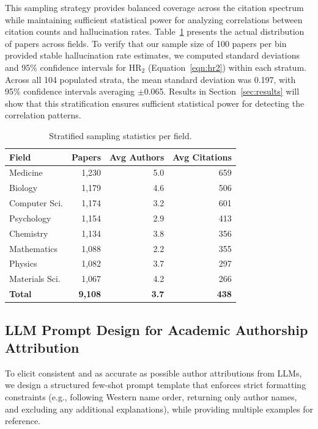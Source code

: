\documentclass[11pt]{article}
\begin{document}
This sampling strategy provides balanced coverage across the citation spectrum while maintaining sufficient statistical power for analyzing correlations between citation counts and hallucination rates. Table~\ref{tab:field_sample_sizes} presents the actual distribution of papers across fields. To verify that our sample size of 100 papers per bin provided stable hallucination rate estimates, we computed standard deviations and 95\% confidence intervals for HR$_2$ (Equation~\ref{eqn:hr2}) within each  stratum. Across all 104 populated strata, the mean standard deviation was 0.197, with 95\% confidence intervals averaging $\pm$0.065. Results in Section~\ref{sec:results} will show that this stratification ensures sufficient statistical power for detecting the correlation patterns.

\setlength{\tabcolsep}{1pt}
\begin{table}[tb!]
  \centering
  \footnotesize
  \captionsetup{font=small}
  \begin{tabular}{@{}lrrr@{}}
    \toprule
    \textbf{Field} & \textbf{Papers} & \textbf{Avg Authors} & \textbf{Avg Citations} \\
    \midrule
    Medicine & 1,230 & 5.0 & 659 \\
    Biology & 1,179 & 4.6 & 506 \\
    Computer Sci. & 1,174 & 3.2 & 601 \\
    Psychology & 1,154 & 2.9 & 413 \\
    Chemistry & 1,134 & 3.8 & 356 \\
    Mathematics & 1,088 & 2.2 & 355 \\
    Physics & 1,082 & 3.7 & 297 \\
    Materials Sci. & 1,067 & 4.2 & 266 \\
    \midrule
    \textbf{Total} & \textbf{9,108} & \textbf{3.7} & \textbf{438} \\
    \bottomrule
  \end{tabular}
    \caption{Stratified sampling statistics per field.}
  \label{tab:field_sample_sizes}
\end{table}

\subsection{LLM Prompt Design for Academic Authorship Attribution}
\label{sec:prompt_design}

To elicit consistent and as accurate as possible author attributions from LLMs, we design a structured few-shot prompt template that enforces strict formatting constraints (e.g., following Western name order, returning only author names, and excluding any additional explanations), while providing multiple examples for reference.
\end{document}
